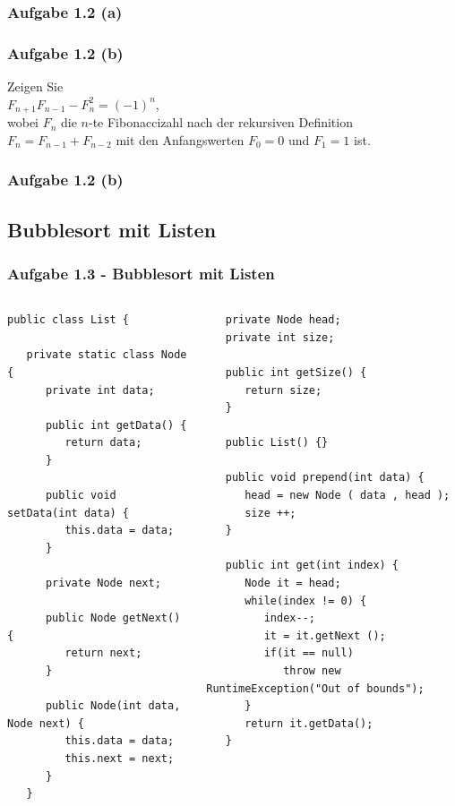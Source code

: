 \documentclass{beamer}
\begin{document}
\begin{frame}
	\frametitle{Aufgabe 1.2 (a)}
\end{frame}

\begin{frame}
	\frametitle{Aufgabe 1.2 (b)}
	Zeigen Sie \\
	\smallskip
	$F_{n+1}F_{n-1} - F_n^2 = (-1)^n$, \\
	\smallskip
	wobei $F_n$ die $n$-te Fibonaccizahl nach der rekursiven Definition $F_n = F_{n-1} + F_{n-2}$
	mit den Anfangswerten $F_0 = 0$ und $F_1 = 1$ ist.
\end{frame}

\begin{frame}
	\frametitle{Aufgabe 1.2 (b)}
\end{frame}

\subsection{Bubblesort mit Listen}
\begin{frame}[fragile]
	\frametitle{Aufgabe 1.3 - Bubblesort mit Listen}
	\begin{columns}
		\begin{column}[t]{0.48\textwidth}
			\begin{verbatim}
public class List {

   private static class Node {
      private int data;

      public int getData() {
         return data;
      }

      public void setData(int data) {
         this.data = data;
      }

      private Node next;

      public Node getNext() {
         return next;
      }

      public Node(int data, Node next) {
         this.data = data;
         this.next = next;
      }
   }
        \end{verbatim}
		\end{column}

		\begin{column}[t]{0.48\textwidth}
			\begin{verbatim}
   private Node head;
   private int size;

   public int getSize() {
      return size;
   }

   public List() {}

   public void prepend(int data) {
      head = new Node ( data , head );
      size ++;
   }

   public int get(int index) {
      Node it = head;
      while(index != 0) {
         index--;
         it = it.getNext ();
         if(it == null) 
            throw new RuntimeException("Out of bounds");
      }
      return it.getData();
   }
        \end{verbatim}
		\end{column}
	\end{columns}
\end{frame}
\end{document}
